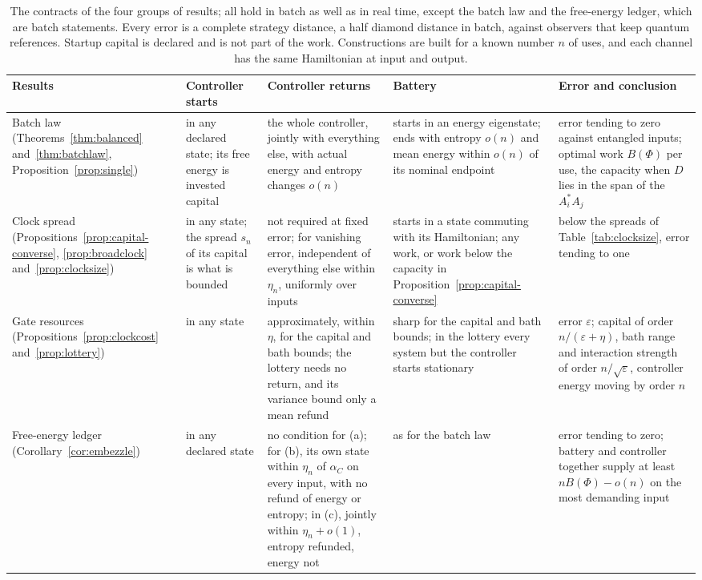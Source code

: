 \documentclass[11pt]{article}
\theoremstyle{definition}
\theoremstyle{remark}
\begin{document}
\begin{table}[ht]
\centering
\small
\begin{tabular}{@{}>{\raggedright\arraybackslash}p{2.4cm}>{\raggedright\arraybackslash}p{2.3cm}>{\raggedright\arraybackslash}p{3.1cm}>{\raggedright\arraybackslash}p{3.1cm}>{\raggedright\arraybackslash}p{3.4cm}@{}}
\toprule
Results & Controller starts & Controller returns & Battery & Error and conclusion\\
\midrule
Batch law (Theorems~\ref{thm:balanced} and~\ref{thm:batchlaw}, Proposition~\ref{prop:single}) & in any declared state; its free energy is invested capital & the whole controller, jointly with everything else, with actual energy and entropy changes $o(n)$ & starts in an energy eigenstate; ends with entropy $o(n)$ and mean energy within $o(n)$ of its nominal endpoint & error tending to zero against entangled inputs; optimal work $B(\Phi)$ per use, the capacity when $D$ lies in the span of the $A_i^*A_j$\\
Clock spread (Propositions~\ref{prop:capital-converse}, \ref{prop:broadclock} and~\ref{prop:clocksize}) & in any state; the spread $s_n$ of its capital is what is bounded & not required at fixed error; for vanishing error, independent of everything else within $\eta_n$, uniformly over inputs & starts in a state commuting with its Hamiltonian; any work, or work below the capacity in Proposition~\ref{prop:capital-converse} & below the spreads of Table~\ref{tab:clocksize}, error tending to one\\
Gate resources (Propositions~\ref{prop:clockcost} and~\ref{prop:lottery}) & in any state & approximately, within $\eta$, for the capital and bath bounds; the lottery needs no return, and its variance bound only a mean refund & sharp for the capital and bath bounds; in the lottery every system but the controller starts stationary & error $\varepsilon$; capital of order $n/(\varepsilon+\eta)$, bath range and interaction strength of order $n/\sqrt\varepsilon$, controller energy moving by order $n$\\
Free-energy ledger (Corollary~\ref{cor:embezzle}) & in any declared state & no condition for (a); for (b), its own state within $\eta_n$ of $\alpha_C$ on every input, with no refund of energy or entropy; in (c), jointly within $\eta_n+o(1)$, entropy refunded, energy not & as for the batch law & error tending to zero; battery and controller together supply at least $nB(\Phi)-o(n)$ on the most demanding input\\
\bottomrule
\end{tabular}
\caption{The contracts of the four groups of results; all hold in batch as well as in real time, except the batch law and the free-energy ledger, which are batch statements. Every error is a complete strategy distance, a half diamond distance in batch, against observers that keep quantum references. Startup capital is declared and is not part of the work. Constructions are built for a known number $n$ of uses, and each channel has the same Hamiltonian at input and output.}\label{tab:contract}
\end{table}
\end{document}
